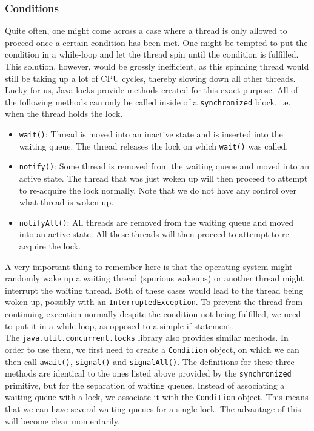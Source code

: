 \documentclass[main]{subfiles}
\begin{document}

\subsubsection{Conditions}
Quite often, one might come across a case where a thread is only allowed to proceed once a certain condition has been met. One might be tempted to put the condition in a while-loop and let the thread spin until the condition is fulfilled. This solution, however, would be grossly inefficient, as this spinning thread would still be taking up a lot of CPU cycles, thereby slowing down all other threads.\\[3mm]
Lucky for us, Java locks provide methods created for this exact purpose. All of the following methods can only be called inside of a \texttt{synchronized} block, i.e. when the thread holds the lock.
\begin{itemize}
    \item \texttt{wait()}: Thread is moved into an inactive state and is inserted into the waiting queue. The thread releases the lock on which \texttt{wait()} was called.
    \item \texttt{notify()}: Some thread is removed from the waiting queue and moved into an active state. The thread that was just woken up will then proceed to attempt to re-acquire the lock normally. Note that we do not have any control over what thread is woken up.
    \item \texttt{notifyAll()}: All threads are removed from the waiting queue and moved into an active state. All these threads will then proceed to attempt to re-acquire the lock.
\end{itemize}
A very important thing to remember here is that the operating system might randomly wake up a waiting thread (spurious wakeups) or another thread might interrupt the waiting thread. Both of these cases would lead to the thread being woken up, possibly with an \texttt{InterruptedException}. To prevent the thread from continuing execution normally despite the condition not being fulfilled, we need to put it in a while-loop, as opposed to a simple if-statement.\\[3mm]
The \texttt{java.util.concurrent.locks} library also provides similar methods. In order to use them, we first need to create a \texttt{Condition} object, on which we can then call \texttt{await()}, \texttt{signal()} and \texttt{signalAll()}. The definitions for these three methods are identical to the ones listed above provided by the \texttt{synchronized} primitive, but for the separation of waiting queues. Instead of associating a waiting queue with a lock, we associate it with the \texttt{Condition} object. This means that we can have several waiting queues for a single lock. The advantage of this will become clear momentarily.\\[3mm]
\end{document}

